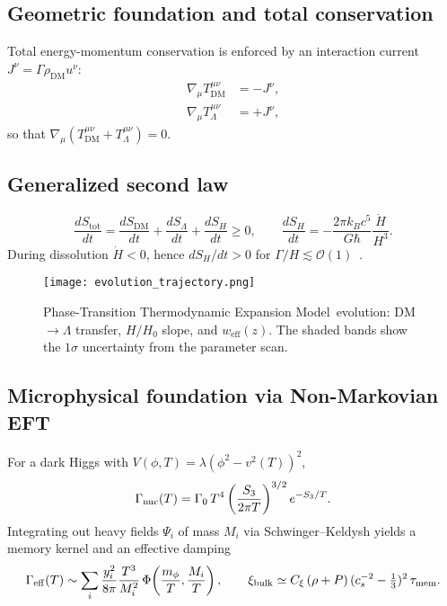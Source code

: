 \documentclass[preprint,aps,prd,onecolumn,nofootinbib,longbibliography]{revtex4-2}
\newcommand{\PTTEM}{Phase-Transition Thermodynamic Expansion Model}
\numberwithin{equation}{section}
\begin{document}
\subsection{Geometric foundation and total conservation}
\label{sec:geom}
Total energy-momentum conservation is enforced by an interaction current $J^\nu=\Gamma\rho_{\mathrm{DM}}u^\nu$:
\begin{align}
\nabla_\mu T_{\mathrm{DM}}^{\mu\nu} &= -J^\nu, \label{eq:geom_flow1}\\
\nabla_\mu T_{\Lambda}^{\mu\nu} &= +J^\nu, \label{eq:geom_flow2}
\end{align}
so that $\nabla_\mu\!\left(T_{\mathrm{DM}}^{\mu\nu}+T_\Lambda^{\mu\nu}\right)=0$.

\subsection{Generalized second law}
\label{sec:gsl}
\begin{equation}
\frac{dS_{\mathrm{tot}}}{dt}=\frac{dS_{\mathrm{DM}}}{dt}+\frac{dS_\Lambda}{dt}+\frac{dS_H}{dt}\ge 0,\qquad
\frac{dS_H}{dt}= -\frac{2\pi k_B c^5}{G\hbar}\frac{\dot H}{H^3}. \label{eq:SHdot}
\end{equation}
During dissolution $\dot H<0$, hence $dS_H/dt>0$ for $\Gamma/H\lesssim\mathcal O(1)$~\cite{Gibbons1977,Davies1988}.

\begin{figure}[H]
  \centering
  \texttt{[image: evolution\_trajectory.png]}
  \caption{
    \PTTEM\ evolution: DM$\to\Lambda$ transfer, $H/H_0$ slope, and $w_{\mathrm{eff}}(z)$.
    The shaded bands show the $1\sigma$ uncertainty from the parameter scan.
  }
  \label{fig:evo}
\end{figure}

\subsection{Microphysical foundation via Non-Markovian EFT}
\label{sec:nonmarkov}
For a dark Higgs with $V(\phi,T)=\lambda(\phi^2-v^2(T))^2$,
\begin{equation}
\Gamma_{\rm nuc}(T)=\Gamma_0\,T^4\left(\frac{S_3}{2\pi T}\right)^{3/2}e^{-S_3/T}.
\end{equation}
Integrating out heavy fields $\Psi_i$ of mass $M_i$ via Schwinger--Keldysh yields a memory kernel and an effective damping
\begin{equation}
\Gamma_{\rm eff}(T)\sim \sum_i \frac{y_i^2}{8\pi}\frac{T^3}{M_i^2}\,\Phi\!\left(\frac{m_\phi}{T},\frac{M_i}{T}\right),\qquad
\xi_{\rm bulk}\simeq C_\xi\,(\rho+P)\,(c_s^{-2}-\tfrac{1}{3})^2\,\tau_{\rm mem}.
\end{equation}
\end{document}
